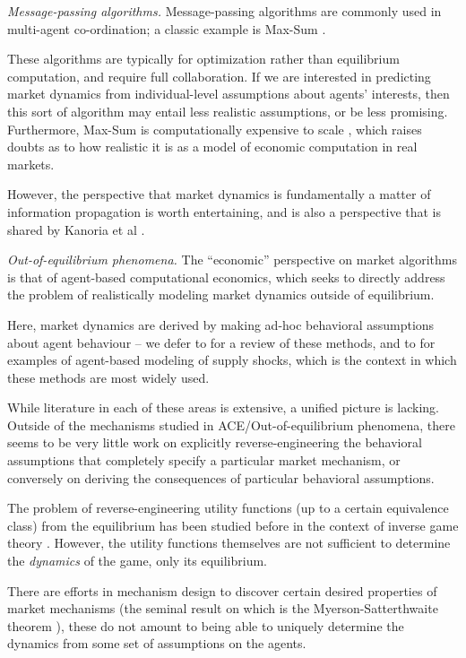 \documentclass{article}
\newcommand{\substatement}[1]{\par\medskip
  {\emph{#1.}}\space
}
\begin{document}
\substatement{Message-passing algorithms} Message-passing algorithms are commonly used in multi-agent co-ordination; a classic example is Max-Sum \cite{rogers}. 

These algorithms are typically for optimization rather than equilibrium computation, and require full collaboration. If we are interested in predicting market dynamics from individual-level assumptions about agents' interests, then this sort of algorithm may entail less realistic assumptions, or be less promising. Furthermore, Max-Sum is computationally expensive to scale \cite{khan}, which raises doubts as to how realistic it is as a model of economic computation in real markets. 

However, the perspective that market dynamics is fundamentally a matter of information propagation is worth entertaining, and is also a perspective that is shared by Kanoria et al \cite{bayati1, bayati2, bayati3}.

\substatement{Out-of-equilibrium phenomena} The ``economic'' perspective on market algorithms is that of agent-based computational economics, which seeks to directly address the problem of realistically modeling market dynamics outside of equilibrium. 

Here, market dynamics are derived by making ad-hoc behavioral assumptions about agent behaviour -- we defer to \cite{hce:32} for a review of these methods, and to \cite{gas, hal1, hal2} for examples of agent-based modeling of supply shocks, which is the context in which these methods are most widely used.

\par\medskip

While literature in each of these areas is extensive, a unified picture is lacking. Outside of the mechanisms studied in ACE/Out-of-equilibrium phenomena, there seems to be very little work on explicitly reverse-engineering the behavioral assumptions that completely specify a particular market mechanism, or conversely on deriving the consequences of particular behavioral assumptions.

The problem of reverse-engineering utility functions (up to a certain equivalence class) from the equilibrium has been studied before in the context of inverse game theory \cite{igt, egt, aumann, expressivity, bishop}. However, the utility functions themselves are not sufficient to determine the \emph{dynamics} of the game, only its equilibrium.

There are efforts in mechanism design to discover certain desired properties of market mechanisms (the seminal result on which is the Myerson-Satterthwaite theorem \cite{myerson}), these do not amount to being able to uniquely determine the dynamics from some set of assumptions on the agents.
\end{document}
